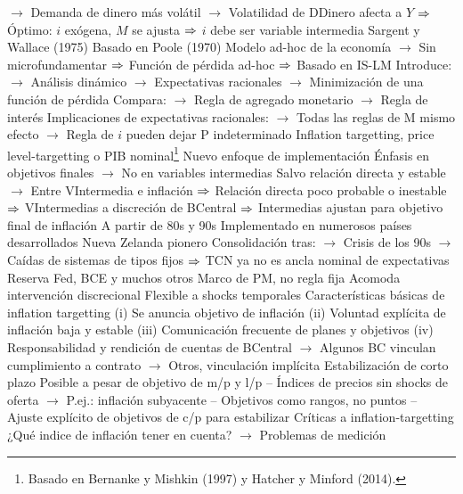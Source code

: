 \documentclass{nuevotema}
\begin{document}
\begin{esquemal}
				\4[] $\to$ Demanda de dinero más volátil
				\4[] $\to$ Volatilidad de DDinero afecta a $Y$
				\4[] $\Rightarrow$ Óptimo: $i$ exógena, $M$ se ajusta
				\4[] $\Rightarrow$ $i$ debe ser variable intermedia
				\4[] 
				\4 Sargent y Wallace (1975)
				\4[] Basado en Poole (1970)
				\4[] Modelo ad-hoc de la economía
				\4[] $\to$ Sin microfundamentar
				\4[] $\Rightarrow$ Función de pérdida ad-hoc
				\4[] $\Rightarrow$ Basado en IS-LM
				\4[] Introduce:
				\4[] $\to$ Análisis dinámico
				\4[] $\to$ Expectativas racionales
				\4[] $\to$ Minimización de una función de pérdida
				\4[] Compara:
				\4[] $\to$ Regla de agregado monetario
				\4[] $\to$ Regla de interés
				\4[] Implicaciones de expectativas racionales:
				\4[] $\to$ Todas las reglas de M mismo efecto
				\4[] $\to$ Regla de $i$ pueden dejar P indeterminado
			\3 Inflation targetting, price level-targetting o PIB nominal\footnote{Basado en Bernanke y Mishkin (1997) y Hatcher y Minford (2014).}
				\4 Nuevo enfoque de implementación
				\4[] Énfasis en objetivos finales
				\4[] $\to$ No en variables intermedias
				\4[] Salvo relación directa y estable
				\4[] $\to$ Entre VIntermedia e inflación
				\4[] $\Rightarrow$ Relación directa poco probable o inestable
				\4[] $\Rightarrow$ VIntermedias a discreción de BCentral
				\4[] $\Rightarrow$ Intermedias ajustan para objetivo final de inflación
				\4 A partir de 80s y 90s
				\4[] Implementado en numerosos países desarrollados
				\4[] Nueva Zelanda pionero
				\4[] Consolidación tras:
				\4[] $\to$ Crisis de los 90s
				\4[] $\to$ Caídas de sistemas de tipos fijos
				\4[] $\Rightarrow$ TCN ya no es ancla nominal de expectativas
				\4[] Reserva Fed, BCE y muchos otros
				\4 Marco de PM, no regla fija
				\4[] Acomoda intervención discrecional
				\4[] Flexible a shocks temporales
				\4 Características básicas de inflation targetting
				\4[] (i) Se anuncia objetivo de inflación
				\4[] (ii) Voluntad explícita de inflación baja y estable
				\4[] (iii) Comunicación frecuente de planes y objetivos
				\4[] (iv) Responsabilidad y rendición de cuentas de BCentral
				\4[] $\to$ Algunos BC vinculan cumplimiento a contrato
				\4[] $\to$ Otros, vinculación implícita
				\4 Estabilización de corto plazo
				\4[] Posible a pesar de objetivo de m/p y l/p
				\4[] -- Índices de precios sin shocks de oferta
				\4[] $\to$ P.ej.: inflación subyacente
				\4[] -- Objetivos como rangos, no puntos
				\4[] -- Ajuste explícito de objetivos de c/p para estabilizar
				\4 Críticas a inflation-targetting
				\4[] ¿Qué indice de inflación tener en cuenta?
				\4[] $\to$ Problemas de medición

\end{esquemal}
\end{document}
